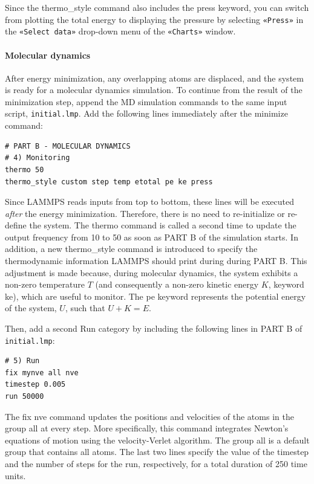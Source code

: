 \documentclass[9pt,tutorial]{livecoms}
\newcommand{\lmpcmd}[1]{\hspace{0pt}\colorbox{listing}{\textcolor{command}{\small{#1}}}\hspace{0pt}} %
\newcommand{\flecmd}[1]{\textcolor{command}{\texttt{#1}}} %
\newcommand{\guicmd}[1]{\textcolor{command}{\texttt{«#1»}}} %
\begin{document}
\begin{note}
Since the \lmpcmd{thermo\_style} command also includes the \lmpcmd{press}
keyword, you can switch from plotting the total energy to
displaying the pressure by selecting \guicmd{Press} in the \guicmd{Select data}
drop-down menu of the \guicmd{Charts} window.
\end{note}

\paragraph{Molecular dynamics}

After energy minimization, any overlapping atoms are displaced, and
the system is ready for a molecular dynamics simulation.  To continue
from the result of the minimization step, append the MD simulation
commands to the same input script, \flecmd{initial.lmp}.  Add the
following lines immediately after the \lmpcmd{minimize} command:
\begin{lstlisting}
# PART B - MOLECULAR DYNAMICS
# 4) Monitoring
thermo 50
thermo_style custom step temp etotal pe ke press
\end{lstlisting}

Since LAMMPS reads inputs from top to bottom, these lines will
be executed \emph{after} the energy minimization.  Therefore,
there is no need to re-initialize or re-define the
system.  The \lmpcmd{thermo} command is called a second time to
update the output frequency from 10 to 50 as soon as \lmpcmd{PART B} of
the simulation starts.  In addition, a new \lmpcmd{thermo\_style}
command is introduced to specify the thermodynamic information LAMMPS should
print during during \lmpcmd{PART B}.  This adjustment is made because, during
molecular dynamics, the system exhibits a non-zero temperature $T$ (and
consequently a non-zero kinetic energy $K$, keyword \lmpcmd{ke}), which are useful to monitor.
The \lmpcmd{pe} keyword represents the potential energy of the system, $U$, such that
$U + K = E$.

Then, add a second \lmpcmd{Run} category by including the following
lines in \lmpcmd{PART B} of \flecmd{initial.lmp}:
\begin{lstlisting}
# 5) Run
fix mynve all nve
timestep 0.005
run 50000
\end{lstlisting}
The \lmpcmd{fix nve} command updates the positions and velocities of the
atoms in the group \lmpcmd{all} at every step.  {\color{blue}More specifically,
this command integrates Newton's equations of motion using the velocity-Verlet algorithm.} 
The group \lmpcmd{all} is a default group that contains all atoms.  The last two lines specify
the value of the \lmpcmd{timestep} and the number of steps for the
\lmpcmd{run}, respectively, for a total duration of 250 time units.
\end{document}
